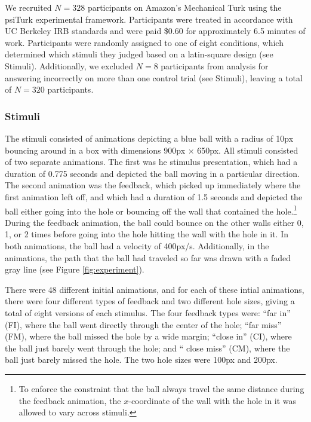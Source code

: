 \documentclass[11pt]{article}
\begin{document}
We recruited $N=328$ participants on Amazon's Mechanical Turk using the psiTurk \cite{McDonnell12} experimental framework. Participants were treated in accordance with UC Berkeley IRB standards and were paid \$0.60 for approximately 6.5 minutes of work. Participants were randomly assigned to one of eight conditions, which determined which stimuli they judged based on a latin-square design (see Stimuli). Additionally, we excluded $N=8$ participants from analysis for answering incorrectly on more than one control trial (see Stimuli), leaving a total of $N=320$ participants.

\subsubsection{Stimuli}

The stimuli consisted of animations depicting a blue ball with a radius of 10px bouncing around in a box with dimensions 900px $\times$ 650px. All stimuli consisted of two separate animations. The first was he stimulus presentation, which had a duration of 0.775 seconds and depicted the ball moving in a particular direction. The second animation was the feedback, which picked up immediately where the first animation left off, and which had a duration of 1.5 seconds and depicted the ball either going into the hole or bouncing off the wall that contained the hole.\footnote{To enforce the constraint that the ball always travel the same distance during the feedback animation, the $x$-coordinate of the wall with the hole in it was allowed to vary across stimuli.} During the feedback animation, the ball could bounce on the other walls either 0, 1, or 2 times before going into the hole hitting the wall with the hole in it. In both animations, the ball had a velocity of 400px/s. Additionally, in the animations, the path that the ball had traveled so far was drawn with a faded gray line (see Figure \ref{fig:experiment}).

There were 48 different initial animations, and for each of these intial animations, there were four different types of feedback and two different hole sizes, giving a total of eight versions of each stimulus. The four feedback types were: ``far in'' (FI), where the ball went directly through the center of the hole; ``far miss'' (FM), where the ball missed the hole by a wide margin; ``close in'' (CI), where the ball just barely went through the hole; and `` close miss'' (CM), where the ball just barely missed the hole. The two hole sizes were 100px and 200px.
\end{document}

